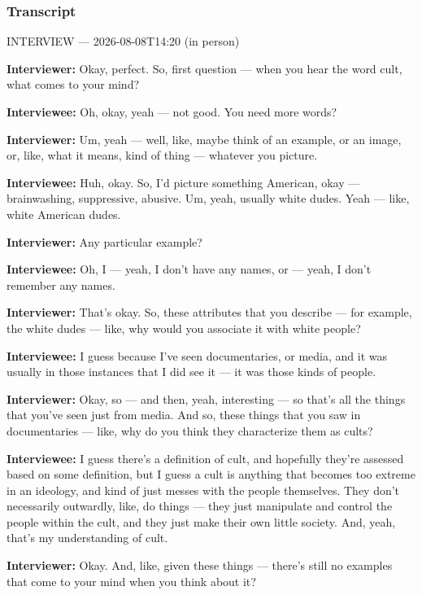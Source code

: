 \subsubsection*{Transcript}
INTERVIEW — 2026-08-08T14:20 (in person)

\textbf{Interviewer:} Okay, perfect. So, first question — when you hear the word cult, what comes to your mind?

\textbf{Interviewee:} Oh, okay, yeah — not good. You need more words?

\textbf{Interviewer:} Um, yeah — well, like, maybe think of an example, or an image, or, like, what it means, kind of thing — whatever you picture.

\textbf{Interviewee:} Huh, okay. So, I'd picture something American, okay — brainwashing, suppressive, abusive. Um, yeah, usually white dudes. Yeah — like, white American dudes.

\textbf{Interviewer:} Any particular example?

\textbf{Interviewee:} Oh, I — yeah, I don't have any names, or — yeah, I don't remember any names.

\textbf{Interviewer:} That's okay. So, these attributes that you describe — for example, the white dudes — like, why would you associate it with white people?

\textbf{Interviewee:} I guess because I've seen documentaries, or media, and it was usually in those instances that I did see it — it was those kinds of people.

\textbf{Interviewer:} Okay, so — and then, yeah, interesting — so that's all the things that you've seen just from media. And so, these things that you saw in documentaries — like, why do you think they characterize them as cults?

\textbf{Interviewee:} I guess there's a definition of cult, and hopefully they're assessed based on some definition, but I guess a cult is anything that becomes too extreme in an ideology, and kind of just messes with the people themselves. They don't necessarily outwardly, like, do things — they just manipulate and control the people within the cult, and they just make their own little society. And, yeah, that's my understanding of cult.

\textbf{Interviewer:} Okay. And, like, given these things — there's still no examples that come to your mind when you think about it?

